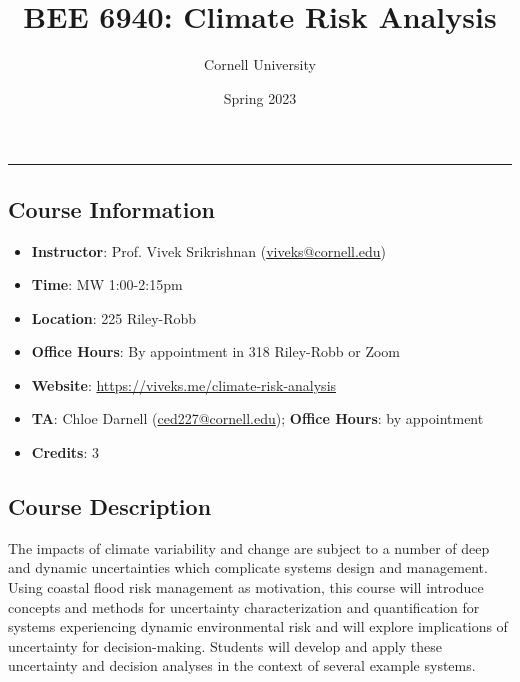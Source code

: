 \documentclass[12pt,a4paper]{article}
\title{ BEE 6940: Climate Risk Analysis }
\author{ Cornell University }
\date{ Spring 2023 }
\begin{document}
\maketitle

\thispagestyle{firststyle}

\noindent\rule{\textwidth}{1pt}

\tableofcontents

\vspace{2mm}


\subsection{Course Information}
\begin{itemize}
\item \textbf{Instructor}: Prof. Vivek Srikrishnan (\href{mailto:viveks@cornell.edu}{viveks@cornell.edu})


\item \textbf{Time}: MW 1:00-2:15pm


\item \textbf{Location}: 225 Riley-Robb


\item \textbf{Office Hours}: By appointment in 318 Riley-Robb or Zoom


\item \textbf{Website}: \href{https://viveks.me/climate-risk-analysis}{https://viveks.me/climate-risk-analysis}


\item \textbf{TA}: Chloe Darnell (\href{mailto:ced227@cornell.edu}{ced227@cornell.edu}); \textbf{Office Hours}: by appointment


\item \textbf{Credits}: 3

\end{itemize}
\subsection{Course Description}
The impacts of climate variability and change are subject to a number of deep and dynamic uncertainties which complicate systems design and management. Using coastal flood risk management as motivation, this course will introduce concepts and methods for uncertainty characterization and quantification for systems experiencing dynamic environmental risk and will explore implications of uncertainty for decision-making. Students will develop and apply these uncertainty and decision analyses in the context of several example systems. 
\end{document}
